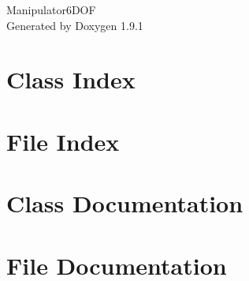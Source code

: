 \let\mypdfximage\pdfximage\def\pdfximage{\immediate\mypdfximage}\documentclass[twoside]{book}
\newcommand{\+}{\discretionary{\mbox{\scriptsize$\hookleftarrow$}}{}{}}
\newcommand{\clearemptydoublepage}{%
  \newpage{\pagestyle{empty}\cleardoublepage}%
}
\begin{document}
\raggedbottom

\hypersetup{pageanchor=false,
             bookmarksnumbered=true,
             pdfencoding=unicode
            }
\begin{titlepage}
\vspace*{7cm}
\begin{center}%
{\Large Manipulator6\+DOF }\\
\vspace*{1cm}
{\large Generated by Doxygen 1.9.1}\\
\end{center}
\end{titlepage}
\clearemptydoublepage
{}
\tableofcontents
\clearemptydoublepage
{}
\hypersetup{pageanchor=true}

\chapter{Class Index}

\chapter{File Index}

\chapter{Class Documentation}





\chapter{File Documentation}





\backmatter
\newpage
{}
\clearemptydoublepage
{}
\printindex
\end{document}
